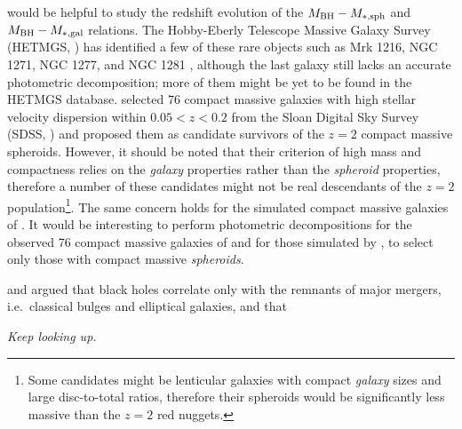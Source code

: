 would be helpful to study the redshift evolution of the $M_{\rm BH} - M_{\rm *,sph}$ 
and $M_{\rm BH} - M_{\rm *,gal}$ relations. 
The Hobby-Eberly Telescope Massive Galaxy Survey (HETMGS, \citealt{vandenBosch2015}) 
has identified a few of these rare objects 
such as Mrk 1216, NGC 1271, NGC 1277, and NGC 1281 \citep{yildirim2016}, 
although the last galaxy still lacks an accurate photometric decomposition; 
more of them might be yet to be found in the HETMGS database. 
\citet{saulder2015} selected 76 compact massive galaxies with high stellar velocity dispersion within $0.05 < z < 0.2$ 
from the Sloan Digital Sky Survey (SDSS, \citealt{abazajian2009}) 
and proposed them as candidate survivors of the $z=2$ compact massive spheroids. 
However, it should be noted that their criterion of high mass and compactness relies on the \emph{galaxy} properties 
rather than the \emph{spheroid} properties, 
therefore a number of these candidates might not be real descendants of the $z=2$ population\footnote{Some 
candidates might be lenticular galaxies with compact \emph{galaxy} sizes and large disc-to-total ratios, 
therefore their spheroids would be significantly less massive than the $z=2$ red nuggets. }. 
The same concern holds for the simulated compact massive galaxies of \citet{wellons2016}. 
It would be interesting to perform photometric decompositions 
for the observed 76 compact massive galaxies of \citet{saulder2015} 
and for those simulated by \citet{wellons2016}, 
to select only those with compact massive \emph{spheroids}. 

\citet{kormendy2011} and \citet{kormendyho2013} argued that black holes correlate only 
with the remnants of major mergers, i.e.~classical bulges and elliptical galaxies, 
and that  


\vspace{5cm}
\begin{flushright}
\emph{Keep looking up. }
\end{flushright}

 
